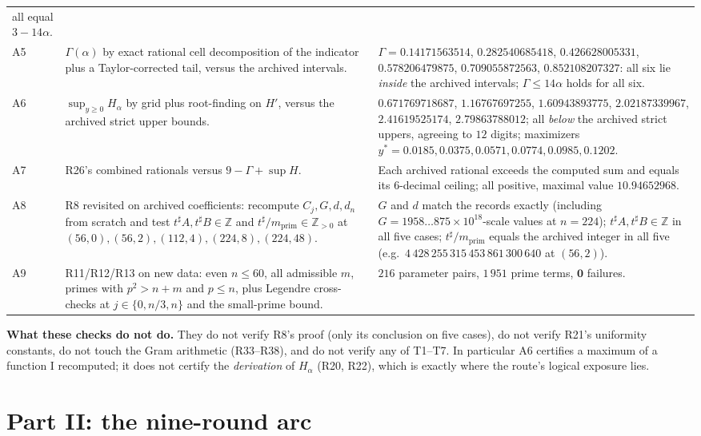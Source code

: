 \documentclass[11pt]{article}
\newcommand{\Z}{\mathbb{Z}}
\begin{document}
\begin{longtable}{@{}p{}p{}p{}@{}}
     all equal $3-14\alpha$. \\
A5 & $\Gamma(\alpha)$ by exact rational cell decomposition of the indicator plus a Taylor-corrected
     tail, versus the archived intervals. & $\Gamma=0.14171563514$, $0.282540685418$, $0.426628005331$,
     $0.578206479875$, $0.709055872563$, $0.852108207327$: all six lie \emph{inside} the archived
     intervals; $\Gamma\le14\alpha$ holds for all six. \\
A6 & $\sup_{y\ge0}H_\alpha$ by grid plus root-finding on $H'$, versus the archived strict upper bounds. &
     $0.671769718687$, $1.16767697255$, $1.60943893775$, $2.02187339967$, $2.41619525174$,
     $2.79863788012$; all \emph{below} the archived strict uppers, agreeing to $12$ digits; maximizers
     $y^\ast=0.0185,0.0375,0.0571,0.0774,0.0985,0.1202$. \\
A7 & R26's combined rationals versus $9-\Gamma+\sup H$. & Each archived rational exceeds the computed
     sum and equals its $6$-decimal ceiling; all positive, maximal value $10.94652968$. \\
A8 & R8 revisited on archived coefficients: recompute $C_j,G,d,d_n$ from scratch and test
     $t^{\sharp}A,t^{\sharp}B\in\Z$ and $t^{\sharp}/m_{\mathrm{prim}}\in\Z_{>0}$ at
     $(56,0),(56,2),(112,4),(224,8),(224,48)$. & $G$ and $d$ match the records exactly (including
     $G=1958\ldots875\times10^{18}$-scale values at $n=224$); $t^{\sharp}A,t^{\sharp}B\in\Z$ in all
     five cases; $t^{\sharp}/m_{\mathrm{prim}}$ equals the archived integer in all five
     (e.g.\ $4\,428\,255\,315\,453\,861\,300\,640$ at $(56,2)$). \\
A9 & R11/R12/R13 on new data: even $n\le60$, all admissible $m$, primes with $p^2>n+m$ and $p\le n$,
     plus Legendre cross-checks at $j\in\{0,n/3,n\}$ and the small-prime bound. &
     $216$ parameter pairs, $1\,951$ prime terms, $\mathbf 0$ failures. \\
\bottomrule
\end{longtable}

\noindent\textbf{What these checks do not do.} They do not verify R8's proof (only its conclusion on five
cases), do not verify R21's uniformity constants, do not touch the Gram arithmetic (R33--R38), and do not
verify any of T1--T7. In particular A6 certifies a maximum of a function I recomputed; it does not
certify the \emph{derivation} of $H_\alpha$ (R20, R22), which is exactly where the route's logical
exposure lies.

\section{Part II: the nine-round arc}
\end{document}
